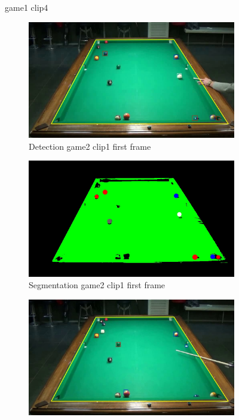 \begin{figure}[H]
	\caption{game1 clip4}
\end{figure}


\begin{figure}[H]
	\centering
	\begin{subfigure}[b]{0.48\textwidth}
		\centering
		\includegraphics[width=\textwidth]{images/Detection/game2_clip1_detected_balls_first_frame.jpg}
		\caption{Detection game2 clip1 first frame}
		\label{fig: game2_clip1_first_frame_detected}
	\end{subfigure}
	\begin{subfigure}[b]{0.48\textwidth}
		\centering
		\includegraphics[width=\textwidth]{images/Segmentation/game2_clip1_segmented_balls_first_frame.jpg}
		\caption{Segmentation game2 clip1 first frame}
		\label{fig: game2_clip1_first_frame_segmented}
	\end{subfigure}
	\centering
	\begin{subfigure}[b]{0.48\textwidth}
		\centering
		\includegraphics[width=\textwidth]{images/Detection/game2_clip1_detected_balls_last_frame.jpg}

\end{subfigure}
\end{figure}
